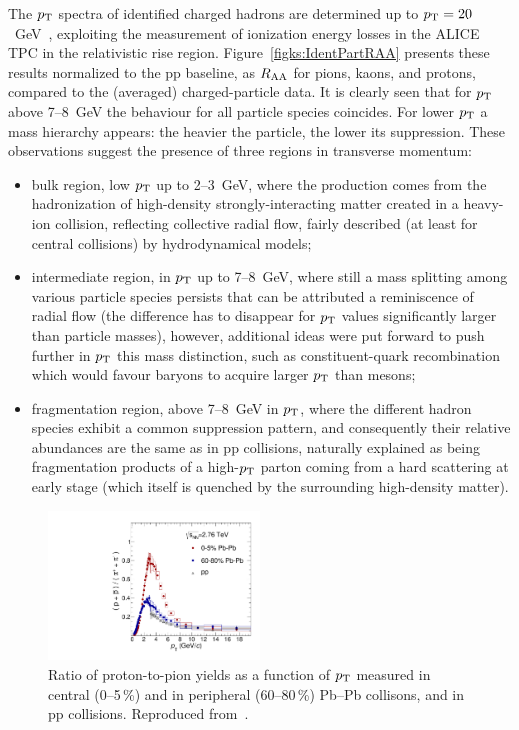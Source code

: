 The $p_{\rm T}$ spectra of identified charged hadrons are determined up to $p_{\rm T} = 20$~GeV~\cite{ALICEIdentHighPtRAA}, exploiting the measurement of ionization energy losses in the ALICE TPC in the relativistic rise region. Figure~\ref{figks:IdentPartRAA} presents these results normalized to the pp baseline, as $R_{\rm AA}$ for pions, kaons, and protons, compared to the (averaged) charged-particle data. It is clearly seen that for $p_{\rm T}$ above 7--8~GeV the behaviour for all particle species coincides. For lower $p_{\rm T}$ a mass hierarchy appears: the heavier the particle, the lower its suppression. These observations suggest the presence of three regions in transverse momentum:
\begin{itemize}
    \item{bulk region, low $p_{\rm T}$ up to 2--3~GeV, where the production comes from the hadronization of high-density strongly-interacting matter created in a heavy-ion collision, reflecting collective radial flow, fairly described (at least for central collisions) by hydrodynamical models;}
    \item{intermediate region, in $p_{\rm T}$ up to 7--8~GeV, where still a mass splitting among various particle species persists that can be attributed a reminiscence of radial flow (the difference has to disappear for $p_{\rm T}$ values significantly larger than particle masses), however, additional ideas were put forward to push further in $p_{\rm T}$ this mass distinction, such as constituent-quark recombination~\cite{Hwa:2006zq} which would favour baryons to acquire larger $p_{\rm T}$ than mesons;}
    \item{fragmentation region, above 7--8~GeV in $p_{\rm T}$, where the different hadron species exhibit a common suppression pattern, and consequently their relative abundances are the same as in pp collisions, naturally explained as being fragmentation products of a high-$p_{\rm T}$ parton coming from a hard scattering at early stage (which itself is quenched by the surrounding high-density matter).}
\end{itemize}

\begin{figure}
\centering
\includegraphics[width=0.5\textwidth]{ksfigures/ProtonToPion.pdf}
\caption{Ratio of proton-to-pion yields as a function of $p_{\rm T}$ measured in central (0--5\,\%) and in peripheral (60--80\,\%) Pb--Pb collisons, and in pp collisions. Reproduced from~\cite{ALICEIdentHighPtRAA}.}
\label{figks:ProtonToPion}
\end{figure}


